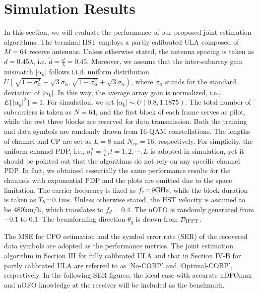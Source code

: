 \documentclass[12pt, draftclsnofoot, onecolumn]{IEEEtran}
\begin{document}
\section{Simulation Results}
In this section, we will evaluate the performance of our proposed joint estimation algorithms. The terminal HST employs a partly calibrated ULA composed of $M=64$ receive antennas. Unless otherwise stated, the antenna spacing is taken as $d=0.45\lambda$, i.e. $\tilde{d}=\frac{d}{\lambda}=0.45$. Moreover, we assume that the inter-subarray gain mismatch $|\alpha_k|$ follows i.i.d. uniform distribution~\cite{CMS_See2004TSP, Y_GE2017SPAWC} $U\left(\sqrt{1-\sigma_{\alpha}^2}-\sqrt{3}\sigma_{\alpha}, \sqrt{1-\sigma_{\alpha}^2}+\sqrt{3} \sigma_{\alpha}\right)$, where $\sigma_{\alpha}$ stands for the standard deviation of $|\alpha_k|$. In this way, the average array gain is normalized, i.e., $E\big\{|\alpha_k|^2\big\}\!=\!1$. For simulation, we set $|\alpha_k| \!\sim\! U\left(0.8, 1.1875 \right)$.
The total number of subcarriers is taken as $N\!=\!64$, and the first block of each frame serves as pilot, while the rest three blocks are reserved for data transmission. Both the training and data symbols are randomly drawn from 16-QAM constellations. The lengths of channel and CP are set as $L\!=\!8$ and $N_{\mathrm{cp}}\!=\!16$, respectively. For simplicity, the uniform channel PDP, i.e., $\sigma_{l}^{2} \!=\! \frac{1}{L}, l \!=\! 1,2,\cdots \!, L$ is adopted in simulation, yet it should be pointed out that the algorithms do not rely on any specific channel PDP. In fact, we obtained essentially the same performance results for the channels with exponential PDP and the plots are omitted due to the space limitation.
The carrier frequency is fixed as $f_c \!=\! 9\rm{GHz}$, while the block duration is taken as $T_b\!=\!0.1\rm{ms}$. Unless otherwise stated, the HST velocity is assumed to be $480\rm{km/h}$, which translates to $f_d \!=\! 0.4$. The nOFO is randomly generated from $-0.1$ to $0.1$. The beamforming direction $\theta_q$ is drawn from ${\mathcal{D}}_{{\rm{IFFT}}}$.

The MSE for CFO estimation and the symbol error rate (SER) of the recovered data symbols are adopted as the performance metrics. The joint estimation algorithm in Section III for fully calibrated ULA and that in Section IV-B for partly calibrated ULA are referred to as `No-COBP' and `Optimal-COBP', respectively. In the following SER figures, the ideal case with accurate nDFOmax and nOFO knowledge at the receiver will be included as the benchmark.
\end{document}
